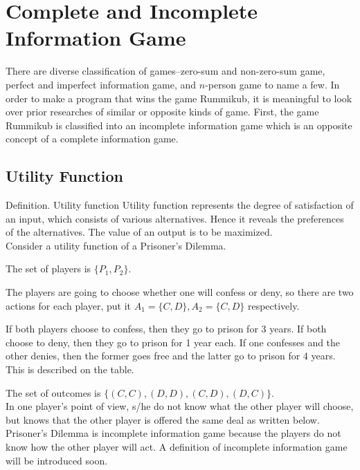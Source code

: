 \documentclass[11pt]{article}
\begin{document}
	\section{Complete and Incomplete Information Game}\label{section-information}
	There are diverse classification of games--zero-sum and non-zero-sum game, perfect and imperfect information game, and $n$-person game to name a few.
	In order to make a program that wins the game Rummikub, it is meaningful to look over prior researches of similar or opposite kinds of game. First, the game Rummikub is classified into an incomplete information game which is an opposite concept of a complete information game. 
	
	
	\subsection{Utility Function}
	Definition. Utility function
	Utility function represents the degree of satisfaction of an input, which consists of various alternatives. Hence it reveals the preferences of the alternatives. The value of an output is to be maximized.\\
	
	Consider a utility function of a Prisoner's Dilemma.
	
	The set of players is $\{P_1, P_2\}$.
	
	The players are going to choose whether one will confess or deny, so there are two actions for each player, put it $A_1=\{C,D\}, A_2=\{C,D\}$ respectively.
	
	If both players choose to confess, then they go to prison for 3 years. If both choose to deny, then they go to prison for 1 year each. If one confesses and the other denies, then the former goes free and the latter go to prison for 4 years. This is described on the table.
	
	The set of outcomes is $\{(C,C), (D,D), (C,D), (D,C)\}$.\\In one player's point of view, s/he do not know what the other player will choose, but knows that the other player is offered the same deal as written below. Prisoner's Dilemma is incomplete information game because the players do not know how the other player will act. A definition of incomplete information game will be introduced soon.%

	
\end{document}
